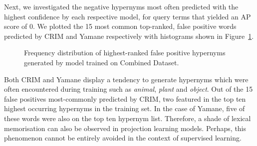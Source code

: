 Next, we investigated the negative hypernyms most often predicted with the highest confidence by each respective model, for query terms that yielded an \ac{AP} score of 0.  We plotted the 15 most common top-ranked, false positive words predicted by CRIM and Yamane respectively with histograms shown in Figure~\ref{fig:false_positive_crim_yamane}.
\begin{figure}[!ht]
    \centering
    \qquad
    \caption{Frequency distribution of highest-ranked false positive hypernyms generated by model trained on Combined Dataset.}        
    \label{fig:false_positive_crim_yamane}
\end{figure}
Both CRIM and Yamane display a tendency to generate hypernyms which were often encountered during training such as \textit{animal}, \textit{plant} and \textit{object}.  Out of the 15 false positives most-commonly predicted by CRIM, two featured in the top ten highest occurring hypernyms in the training set. In the case of Yamane, five of these words were also on the top ten hypernym list.  Therefore, a shade of lexical memorisation can also be observed in projection learning models.  Perhaps, this phenomenon cannot be entirely avoided in the context of supervised learning.  

